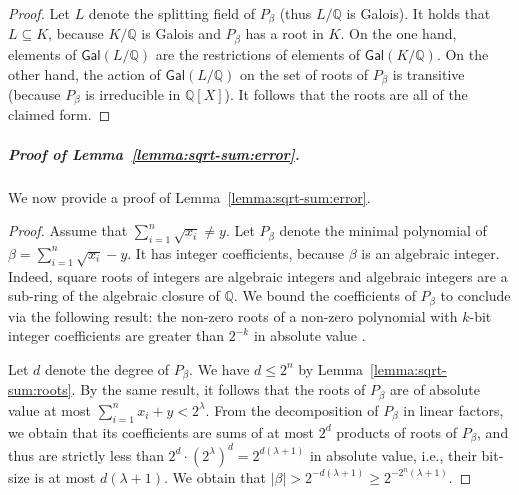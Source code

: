 \documentclass[a4paper,UKenglish,cleveref,autoref,thm-restate,colorlinks]{lipics-v2021}
\newcommand{\sqsx}{x} \newcommand{\sqsxVect}{\bar{x}} \newcommand{\sqsm}{m} \newcommand{\sqsy}{y} \newcommand{\sqsi}{i} \newcommand{\sqsn}{n} \newcommand{\sqsSize}{E}
\newcommand{\IQ}{\mathbb{Q}}
\begin{document}
\begin{proof}
    Let $L$ denote the splitting field of $P_\beta$ (thus $L/\IQ$ is Galois).
    It holds that $L\subseteq K$, because $K/\IQ$ is Galois and $P_\beta$ has a root in $K$.
    On the one hand, elements of $\mathsf{Gal}(L/\IQ)$ are the restrictions of elements of $\mathsf{Gal}(K/\IQ)$.
    On the other hand, the action of $\mathsf{Gal}(L/\IQ)$ on the set of roots of $P_\beta$ is transitive (because $P_\beta$ is irreducible in $\IQ[X]$).
    It follows that the roots are all of the claimed form.
\end{proof}

\subparagraph*{Proof of Lemma~\ref{lemma:sqrt-sum:error}.}
We now provide a proof of Lemma~\ref{lemma:sqrt-sum:error}.

\lemmaSqrtSumError*
\begin{proof}
  Assume that $\sum_{\sqsi=1}^\sqsn\sqrt{\sqsx_\sqsi} \neq\sqsy$.
  Let $P_\beta$ denote the minimal polynomial of $\beta = \sum_{\sqsi=1}^\sqsn\sqrt{\sqsx_\sqsi}-\sqsy$.
  It has integer coefficients, because $\beta$ is an algebraic integer.
  Indeed, square roots of integers are algebraic integers and algebraic integers are a sub-ring of the algebraic closure of $\IQ$.
  We bound the coefficients of $P_\beta$ to conclude via the following result: the non-zero roots of a non-zero polynomial with $k$-bit integer coefficients are greater than $2^{-k}$ in absolute value \cite{householder1970numerical,DBLP:journals/jc/Tiwari92}.

  Let $d$ denote the degree of $P_\beta$.
  We have $d\leq 2^{\sqsn}$ by Lemma~\ref{lemma:sqrt-sum:roots}.
  By the same result, it follows that the roots of $P_\beta$ are of absolute value at most $\sum_{\sqsi=1}^\sqsn\sqsx_\sqsi + \sqsy < 2^\lambda$.
  From the decomposition of $P_\beta$ in linear factors, we obtain that its coefficients are sums of at most $2^d$ products of roots of $P_\beta$, and thus are strictly less than $2^d\cdot (2^\lambda)^d =2^{d(\lambda+1)}$ in absolute value, i.e., their bit-size is at most $d(\lambda+1)$.
  We obtain that $|\beta|> 2^{-d(\lambda+1)}\geq 2^{-2^{\sqsn}(\lambda+1)}$.
\end{proof}

 
\end{document}
